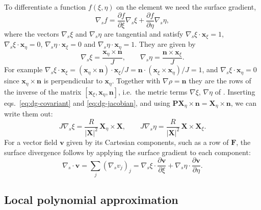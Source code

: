 To differentiate a function $f(\xi,\eta)$ on the element we need the surface gradient,
\begin{equation}\label{eq:dg-surfgrad}
    \nabla_s f = \frac{\partial f}{\partial\xi}\nabla_s\xi + \frac{\partial f}{\partial\eta}\nabla_s\eta,
\end{equation}
where the vectors $\nabla_s\xi$ and $\nabla_s\eta$ are tangential and satisfy $\nabla_s\xi\cdot\mathbf{x}_\xi = 1$, $\nabla_s\xi\cdot\mathbf{x}_\eta = 0$, $\nabla_s\eta\cdot\mathbf{x}_\xi = 0$ and $\nabla_s\eta\cdot\mathbf{x}_\eta = 1$. They are given by
\begin{equation}
    \nabla_s\xi = \frac{\mathbf{x}_\eta\times\mathbf{n}}{J}, \qquad \nabla_s\eta = \frac{\mathbf{n}\times\mathbf{x}_\xi}{J}.
\end{equation}
For example $\nabla_s\xi\cdot\mathbf{x}_\xi = (\mathbf{x}_\eta\times\mathbf{n})\cdot\mathbf{x}_\xi/J = \mathbf{n}\cdot(\mathbf{x}_\xi\times\mathbf{x}_\eta)/J = 1$, and $\nabla_s\xi\cdot\mathbf{x}_\eta = 0$ since $\mathbf{x}_\eta\times\mathbf{n}$ is perpendicular to $\mathbf{x}_\eta$. Together with $\nabla\rho = \mathbf{n}$ they are the rows of the inverse of the matrix $[\mathbf{x}_\xi,\mathbf{x}_\eta,\mathbf{n}]$, i.e.\ the metric terms $\nabla\xi$, $\nabla\eta$ of \cite{GIRALDO2002499}. Inserting eqs.~\eqref{eq:dg-covariant} and \eqref{eq:dg-jacobian}, and using $\mathbf{P}\mathbf{X}_\eta\times\mathbf{n} = \mathbf{X}_\eta\times\mathbf{n}$, we can write them out:
\begin{equation}\label{eq:dg-metric}
    J\nabla_s\xi = \frac{R}{|\mathbf{X}|^2}\,\mathbf{X}_\eta\times\mathbf{X}, \qquad
    J\nabla_s\eta = \frac{R}{|\mathbf{X}|^2}\,\mathbf{X}\times\mathbf{X}_\xi .
\end{equation}
For a vector field $\mathbf{v}$ given by its Cartesian components, such as a row of $\mathbf{F}$, the surface divergence follows by applying the surface gradient to each component:
\begin{equation}\label{eq:dg-surfdiv}
    \nabla_s\cdot\mathbf{v} = \sum_j(\nabla_s v_j)_j = \nabla_s\xi\cdot\frac{\partial\mathbf{v}}{\partial\xi} + \nabla_s\eta\cdot\frac{\partial\mathbf{v}}{\partial\eta}.
\end{equation}

\subsection{Local polynomial approximation}\label{sec:dg-poly}


